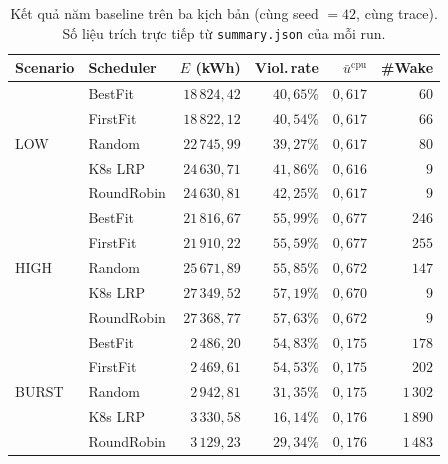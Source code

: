 \begin{table}[H]
  \centering
  \caption{Kết quả năm baseline trên ba kịch bản (cùng seed $= 42$,
  cùng trace). Số liệu trích trực tiếp từ \texttt{summary.json} của
  mỗi run.}
  \label{tab:baseline-results}
  \footnotesize
  \begin{tabular}{llrrrr}
    \toprule
    \textbf{Scenario} & \textbf{Scheduler}
      & \textbf{$E$ (kWh)} & \textbf{Viol.\,rate}
      & \textbf{$\bar u^{\mathrm{cpu}}$} & \textbf{\#Wake} \\
    \midrule
    \multirow{5}{*}{LOW}   & BestFit    & $18\,824{,}42$ & $40{,}65\%$ & $0{,}617$ & $60$  \\
                           & FirstFit   & $18\,822{,}12$ & $40{,}54\%$ & $0{,}617$ & $66$  \\
                           & Random     & $22\,745{,}99$ & $39{,}27\%$ & $0{,}617$ & $80$  \\
                           & K8s LRP    & $24\,630{,}71$ & $41{,}86\%$ & $0{,}616$ & $9$   \\
                           & RoundRobin & $24\,630{,}81$ & $42{,}25\%$ & $0{,}617$ & $9$   \\
    \midrule
    \multirow{5}{*}{HIGH}  & BestFit    & $21\,816{,}67$ & $55{,}99\%$ & $0{,}677$ & $246$ \\
                           & FirstFit   & $21\,910{,}22$ & $55{,}59\%$ & $0{,}677$ & $255$ \\
                           & Random     & $25\,671{,}89$ & $55{,}85\%$ & $0{,}672$ & $147$ \\
                           & K8s LRP    & $27\,349{,}52$ & $57{,}19\%$ & $0{,}670$ & $9$   \\
                           & RoundRobin & $27\,368{,}77$ & $57{,}63\%$ & $0{,}672$ & $9$   \\
    \midrule
    \multirow{5}{*}{BURST} & BestFit    & $2\,486{,}20$  & $54{,}83\%$ & $0{,}175$ & $178$  \\
                           & FirstFit   & $2\,469{,}61$  & $54{,}53\%$ & $0{,}175$ & $202$  \\
                           & Random     & $2\,942{,}81$  & $31{,}35\%$ & $0{,}175$ & $1\,302$ \\
                           & K8s LRP    & $3\,330{,}58$  & $16{,}14\%$ & $0{,}176$ & $1\,890$ \\
                           & RoundRobin & $3\,129{,}23$  & $29{,}34\%$ & $0{,}176$ & $1\,483$ \\
    \bottomrule
  \end{tabular}
\end{table}

